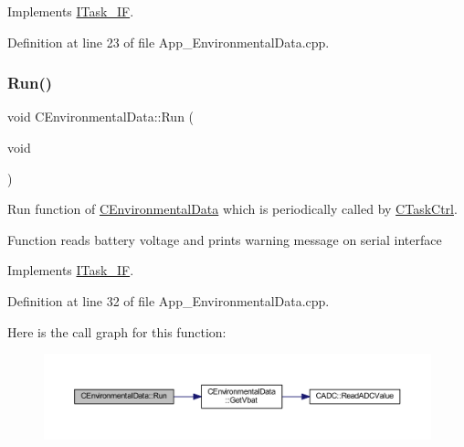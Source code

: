 Implements \mbox{\hyperlink{class_i_task___i_f_a28f608bdb9b19658403f7b9b7421968d}{I\+Task\+\_\+\+IF}}.



Definition at line 23 of file App\+\_\+\+Environmental\+Data.\+cpp.

\mbox{\label{class_c_environmental_data_a586a729d3aab2873812517d950c91242}} 
\subsubsection{\texorpdfstring{Run()}{Run()}}
{\footnotesize\ttfamily void C\+Environmental\+Data\+::\+Run (\begin{DoxyParamCaption}\item[{void}]{ }\end{DoxyParamCaption})\hspace{0.3cm}{\ttfamily [virtual]}}



Run function of \mbox{\hyperlink{class_c_environmental_data}{C\+Environmental\+Data}} which is periodically called by \mbox{\hyperlink{class_c_task_ctrl}{C\+Task\+Ctrl}}. 

Function reads battery voltage and prints warning message on serial interface 

Implements \mbox{\hyperlink{class_i_task___i_f_ab73cc5879a61d00fc59b72cce32cc6f7}{I\+Task\+\_\+\+IF}}.



Definition at line 32 of file App\+\_\+\+Environmental\+Data.\+cpp.

Here is the call graph for this function\+:
\nopagebreak
\begin{figure}[H]
\begin{center}
\leavevmode
\includegraphics[width=350pt]{class_c_environmental_data_a586a729d3aab2873812517d950c91242_cgraph}
\end{center}
\end{figure}
\mbox{\label{class_c_environmental_data_a61a8f487f013602aab4dadcf8a9da4c8}} 
